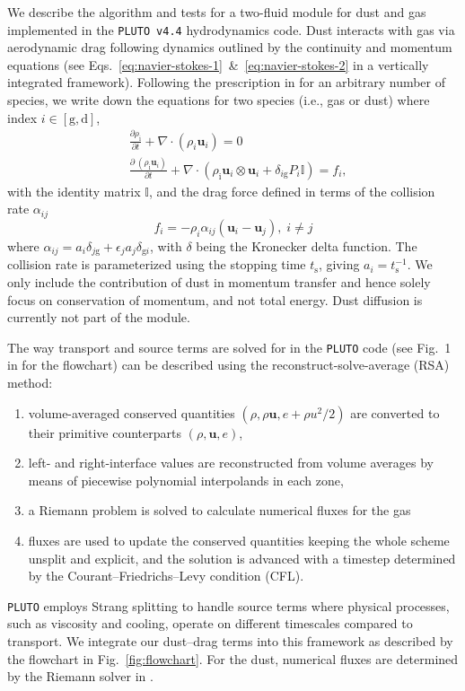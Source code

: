 \documentclass[fleqn,usenatbib,useAMS]{mnras}
\newcommand{\DP}[2]{\frac{\partial{#1}}{\partial{#2}}}
\newcommand{\vel}{\bm{u}}
\newcommand{\ts}{t_\mathrm{s}}
\newcommand{\pluto}{\texttt{PLUTO}}
\begin{document}
We describe the algorithm and tests for a two-fluid module for dust and gas implemented in the \pluto{}~\texttt{v4.4} hydrodynamics code. Dust interacts with gas via aerodynamic drag following dynamics outlined by the continuity and momentum equations (see Eqs.~\eqref{eq:navier-stokes-1}~\&~\eqref{eq:navier-stokes-2} in a vertically integrated framework). Following the prescription in \citet{benitez-etal-2019} for an arbitrary number of species, we write down the equations for two species (i.e., gas or dust) where index $i \in [\text{g}, \text{d}]$, 
\begin{subequations}
	\label{eq:3ddustfluid}
	\begin{align}
		\label{eq:continuity-equations}
		&\DP{\rho_\text{i}}{t} +  \nabla \cdot (\rho_i\vel_i) = 0\\ &\DP{~(\rho_\text{i}\vel_i)}{t} + \nabla \cdot(\rho_\text{i} \vel_i \otimes \vel_i + \delta_{i\mathrm{g}}P_i \mathbb{I} ) =  f_i,
	\end{align}
\end{subequations}
with the identity matrix $\mathbb{I}$, and the drag force defined in terms of the collision rate $\alpha_{ij}$
\begin{equation}
	\label{eq:dust-dragterm}
	f_i = - \rho_i \alpha_{ij} (\vel_i - \vel_j), \; i \neq j 
 \end{equation}
where $\alpha_{ij} = a_i \delta_{j\text{g}} + \epsilon_j a_j \delta_{\text{g}i}$, with $\delta$ being the Kronecker delta function. The collision rate is parameterized using the stopping time $\ts$, giving $a_{i} = \ts^{-1}$.
We only include the contribution of dust in momentum transfer and hence solely focus on conservation of momentum, and not total energy. Dust diffusion is currently not part of the module.

The way transport and source terms are solved for in the \pluto{} code (see Fig.~1 in \citet{mignone-etal-2007} for the flowchart) can be described using the reconstruct-solve-average (RSA) method:
\begin{enumerate}
\item \noindent volume-averaged conserved quantities $\left(\rho,\rho\vel, e+\rho u^2/2\right)$ are converted to their primitive counterparts $\left(\rho, \vel, e\right)$,
\item \noindent left- and right-interface values are reconstructed from volume averages by means of piecewise polynomial interpolands in each zone,
\item \noindent a Riemann problem is solved to calculate numerical fluxes for the gas
\item \noindent fluxes are used to update the conserved quantities keeping the whole scheme unsplit and explicit, and the solution is advanced with a timestep determined by the Courant--Friedrichs--Levy condition (CFL).
\end{enumerate}
\pluto{} employs Strang splitting to handle source terms where physical processes, such as viscosity and cooling, operate on different timescales compared to transport. We integrate our dust--drag terms into this framework as described by the flowchart in Fig.~\ref{fig:flowchart}. For the dust, numerical fluxes are determined by the Riemann solver in \citet{leveque-2004}.
\end{document}
